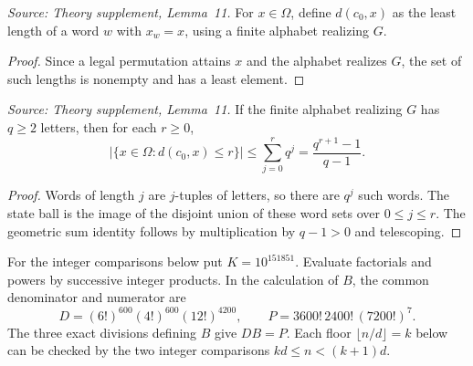 \begin{definition}
  \label{def:word-distance}
  \leanok
  \textit{Source: Theory supplement, Lemma~11.}
  For \(x\in\Omega\), define \(d(c_0,x)\) as the least length of a
  word \(w\) with \(x_w=x\), using a finite alphabet realizing \(G\).
\end{definition}
\begin{proof}
  \leanok
  Since a legal permutation attains \(x\) and the alphabet realizes
  \(G\), the set of such lengths is nonempty and has a least element.
\end{proof}

\begin{lemma}
  \label{lem:word-ball-count}
  \leanok
  \textit{Source: Theory supplement, Lemma~11.}
  If the finite alphabet realizing \(G\) has \(q\ge 2\) letters, then
  for each \(r\ge 0\),
  \[
    |\{x\in\Omega:d(c_0,x)\le r\}|\le
    \sum_{j=0}^{r}q^j=\frac{q^{r+1}-1}{q-1}.
  \]
\end{lemma}
\begin{proof}
  \leanok
  Words of length \(j\) are \(j\)-tuples of letters, so there are \(q^j\)
  such words. The state ball is the image of the disjoint union of
  these word sets over \(0\le j\le r\). The geometric sum identity
  follows by multiplication by \(q-1>0\) and telescoping.
\end{proof}

For the integer comparisons below put \(K=10^{151851}\). Evaluate
factorials and powers by successive integer products. In the
calculation of \(B\), the common denominator and numerator are
\[
  D=(6!)^{600}(4!)^{600}(12!)^{4200},\qquad
  P=3600!\,2400!\,(7200!)^7.
\]
The three exact divisions defining \(B\) give \(D B=P\). Each floor
\(\lfloor n/d\rfloor=k\) below can be checked by the two integer
comparisons \(kd\le n<(k+1)d\).

